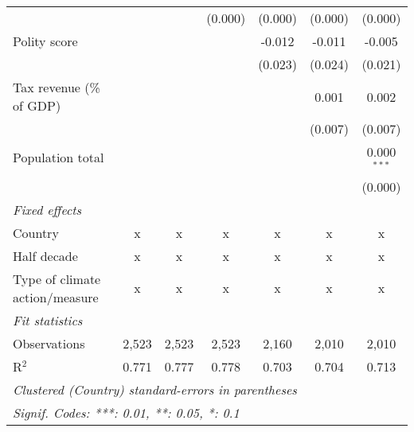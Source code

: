 \begin{tabular}{lcccccc}
                                                                                     &               &               & (0.000)       & (0.000)       & (0.000)       & (0.000)\\   
   Polity score                                                                      &               &               &               & -0.012        & -0.011        & -0.005\\   
                                                                                     &               &               &               & (0.023)       & (0.024)       & (0.021)\\   
   Tax revenue (\% of GDP)                                                           &               &               &               &               & 0.001         & 0.002\\   
                                                                                     &               &               &               &               & (0.007)       & (0.007)\\   
   Population total                                                                  &               &               &               &               &               & 0.000$^{***}$\\   
                                                                                     &               &               &               &               &               & (0.000)\\   
   \emph{Fixed effects}\\
   Country                                                                           & x             & x             & x             & x             & x             & x\\  
   Half decade                                                                       & x             & x             & x             & x             & x             & x\\  
   Type of climate action/measure                                                    & x             & x             & x             & x             & x             & x\\  
   \midrule \emph{Fit statistics}\\
   Observations                                                                      & 2,523         & 2,523         & 2,523         & 2,160         & 2,010         & 2,010\\  
   R$^2$                                                                             & 0.771         & 0.777         & 0.778         & 0.703         & 0.704         & 0.713\\  
   \midrule
   \multicolumn{7}{l}{\emph{Clustered (Country) standard-errors in parentheses}}\\
   \multicolumn{7}{l}{\emph{Signif. Codes: ***: 0.01, **: 0.05, *: 0.1}}\\
\end{tabular}
\par\endgroup


